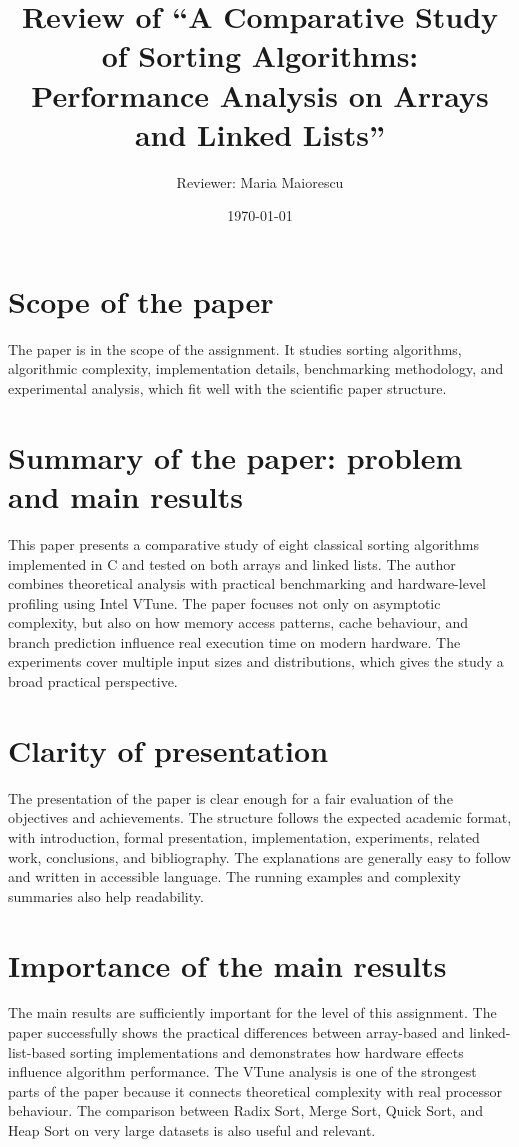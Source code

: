 \documentclass[11pt,a4paper]{article}
\title{Review of ``A Comparative Study of Sorting Algorithms: Performance Analysis on Arrays and Linked Lists''}
\author{Reviewer: Maria Maiorescu}
\date{\today}
\begin{document}
\maketitle

\section{Scope of the paper}

The paper is in the scope of the assignment. It studies sorting algorithms, algorithmic complexity, implementation details, benchmarking methodology, and experimental analysis, which fit well with the scientific paper structure.

\section{Summary of the paper: problem and main results}

This paper presents a comparative study of eight classical sorting algorithms implemented in C and tested on both arrays and linked lists. The author combines theoretical analysis with practical benchmarking and hardware-level profiling using Intel VTune. The paper focuses not only on asymptotic complexity, but also on how memory access patterns, cache behaviour, and branch prediction influence real execution time on modern hardware. The experiments cover multiple input sizes and distributions, which gives the study a broad practical perspective.

\section{Clarity of presentation}

The presentation of the paper is clear enough for a fair evaluation of the objectives and achievements. The structure follows the expected academic format, with introduction, formal presentation, implementation, experiments, related work, conclusions, and bibliography. The explanations are generally easy to follow and written in accessible language. The running examples and complexity summaries also help readability.

\section{Importance of the main results}

The main results are sufficiently important for the level of this assignment. The paper successfully shows the practical differences between array-based and linked-list-based sorting implementations and demonstrates how hardware effects influence algorithm performance. The VTune analysis is one of the strongest parts of the paper because it connects theoretical complexity with real processor behaviour. The comparison between Radix Sort, Merge Sort, Quick Sort, and Heap Sort on very large datasets is also useful and relevant.
\end{document}
